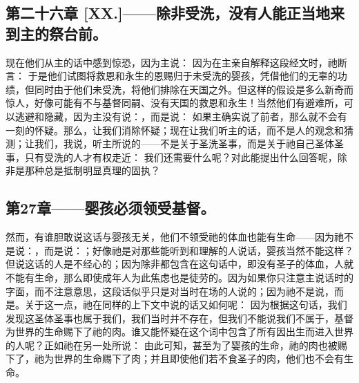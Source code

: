 \subsection{第二十六章 [XX.]——除非受洗，没有人能正当地来到主的祭台前。}

现在他们从主的话中感到惊恐，因为主说： 因为在主亲自解释这段经文时，祂断言： 于是他们试图将救恩和永生的恩赐归于未受洗的婴孩，凭借他们的无辜的功绩，但同时由于他们未受洗，将他们排除在天国之外。但这样的假设是多么新奇而惊人，好像可能有不与基督同嗣、没有天国的救恩和永生！当然他们有避难所，可以逃避和隐藏，因为主没有说：，而是说： 如果主确实说了前者，那么就不会有一刻的怀疑。那么，让我们消除怀疑；现在让我们听主的话，而不是人的观念和猜测；让我们，我说，听主所说的——不是关于圣洗圣事，而是关于祂自己圣体圣事，只有受洗的人才有权走近： 我们还需要什么呢？对此能提出什么回答呢，除非是那种总是抵制明显真理的固执？\par


\subsection{第27章——婴孩必须领受基督。}

然而，有谁胆敢说这话与婴孩无关，他们不领受祂的体血也能有生命——因为祂不是说：，而是说：；好像祂是对那些能听到和理解的人说话，婴孩当然不能这样？但说这话的人是不经心的；因为除非都包含在这句话中，即没有圣子的体血，人就不能有生命，那么即使成年人为此焦虑也是徒劳的。因为如果你只注意主说话时的字面，而不注意意思，这段话似乎只是对当时在场的人说的；因为祂不是说，而是。关于这一点，祂在同样的上下文中说的话又如何呢： 因为根据这句话，我们发现这圣体圣事也属于我们，我们当时并不存在，但我们不能说我们不属于，基督为世界的生命赐下了祂的肉。谁又能怀疑在这个词中包含了所有因出生而进入世界的人呢？正如祂在另一处所说： 由此可知，甚至为了婴孩的生命，祂的肉也被赐下了，祂为世界的生命赐下了肉；并且即使他们若不食圣子的肉，他们也不会有生命。\par

